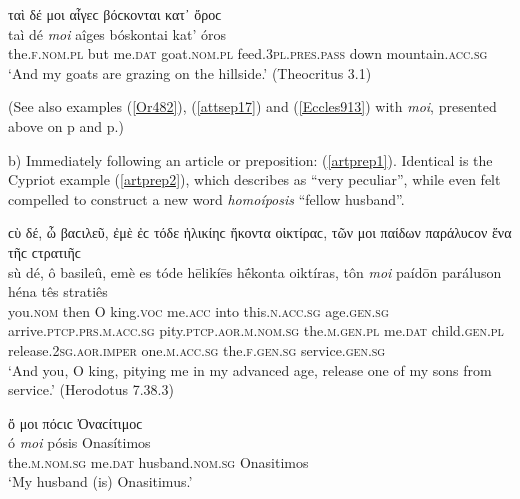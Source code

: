 \begin{exe}
\ex ταὶ δέ μοι αἶγεϲ βόϲκονται κατ᾽ ὄροϲ\\
\gll taì dé \emph{moi} aîges bóskontai kat' óros\\
the.\textsc{f.nom.pl} but me.\textsc{dat} goat.\textsc{nom.pl}
feed.\textsc{3pl.pres.pass} down mountain.\textsc{acc.sg}\\
\trans `And my goats are grazing on the hillside.' (Theocritus 3.1)
\label{part7}
\end{exe}

(See also examples (\ref{Or482}), (\ref{attsep17}) and (\ref{Eccles913}) with \textit{moi}, presented above on p\pageref{Or482} and p\pageref{Eccles913}.)

b) Immediately following an article or preposition: (\ref{artprep1}). Identical is the Cypriot example (\ref{artprep2}), which \citet[323]{Hoffmann1891} describes as ``very peculiar'', while \citet[139--140]{Meister1889} even felt compelled to construct a new word \textit{homoíposis} ``fellow husband''.

\begin{exe}
\ex ϲὺ δέ, ὦ βαϲιλεῦ, ἐμὲ ἐϲ τόδε ἡλικίηϲ ἥκοντα οἰκτίραϲ, τῶν μοι παίδων παράλυϲον ἕνα τῆϲ ϲτρατιῆϲ\\
\gll sù dé, ô basileû, emè es tóde hēlikíēs hḗkonta oiktíras, tôn \emph{moi} paídōn paráluson héna tês stratiês\\
you.\textsc{nom} then O king.\textsc{voc} me.\textsc{acc} into this.\textsc{n.acc.sg} age.\textsc{gen.sg} arrive.\textsc{ptcp.prs.m.acc.sg} pity.\textsc{ptcp.aor.m.nom.sg} the.\textsc{m.gen.pl} me.\textsc{dat} child.\textsc{gen.pl} release.\textsc{2sg.aor.imper} one.\textsc{m.acc.sg}
the.\textsc{f.gen.sg} service.\textsc{gen.sg}\\
\trans `And you, O king, pitying me in my advanced age, release one of my sons from service.' (Herodotus 7.38.3)
\label{artprep1}
\end{exe}

\begin{exe}
\ex ὄ μοι πόϲιϲ Ὀναϲίτιμοϲ\\
\gll ó \emph{moi} pósis Onasítimos\\
the.\textsc{m.nom.sg} me.\textsc{dat} husband.\textsc{nom.sg} Onasitimos\\
\trans `My husband (is) Onasitimus.' \citep[no. 26]{Deecke1884}
\label{artprep2}
\end{exe}

